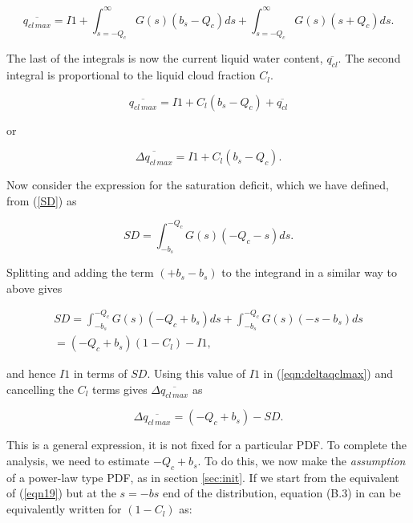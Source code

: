 \documentclass{UMDP_article}
\begin{document}
\begin{equation}
\overline{q_{cl \, max}} = I1 + \int_{s=-Q_c}^{\infty} G(s) (b_s - Q_c) ds
+ \int_{s=-Q_c}^{\infty} G(s) (s + Q_c) ds .
\end{equation}

The last of the integrals is now the current liquid water content,
$\overline{q_{cl}}$.
The second integral is proportional to the liquid cloud fraction $C_l$. 

\begin{equation}
\overline{q_{cl \, max}} = I1 + C_l (b_s - Q_c) + \overline{q_{cl}}
\end{equation}

or

\begin{equation}
\overline{\Delta q_{cl \, max}} = I1 + C_l (b_s - Q_c) .
\label{eqn:deltaqclmax}
\end{equation}

Now consider the expression for the saturation deficit, which we have
defined, from (\ref{SD}) as

\begin{equation}
SD = \int_{-b_s}^{-Q_c} G(s) (-Q_c - s) ds .
\end{equation}

Splitting and adding the term $(+b_s - b_s)$ to the integrand in a
similar way to above gives

\begin{eqnarray}
SD = \int_{-b_s}^{-Q_c} G(s) (-Q_c + b_s) ds + \int_{-b_s}^{-Q_c}
G(s) (-s - b_s) ds \nonumber \\
= (-Q_c + b_s) (1 - C_l) - I1 ,
\end{eqnarray}

and hence $I1$ in terms of $SD$. Using this value of $I1$ in
(\ref{eqn:deltaqclmax}) and cancelling the $C_l$ terms gives
$\Delta \overline{q_{cl \, max}}$ as 

\begin{equation}
\Delta \overline{q_{cl \, max}} = (-Q_c + b_s) - SD .
\label{eqn:delta2}
\end{equation}

This is a general expression, it is not fixed for a particular PDF. To
complete the analysis, we need to estimate $-Q_c+b_s$. To do this, we now
make the \textit{assumption} of a power-law type PDF, as in section
\ref{sec:init}. If we start from the equivalent of
(\ref{eqn19}) but at the $s=-bs$ end of the distribution, equation (B.3)
in \cite{wg03} can be equivalently written for $(1-C_l)$ as:
\end{document}
